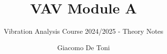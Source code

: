 \documentclass{GDTReportClass}
\title{VAV Module A}  %
\subtitle{Vibration Analysis Course 2024/2025 - Theory Notes}  %
\author{Giacomo De Toni}  %
\begin{document}
    \settingfrontmatter  %

    \settingmaincontent  

\end{document}
